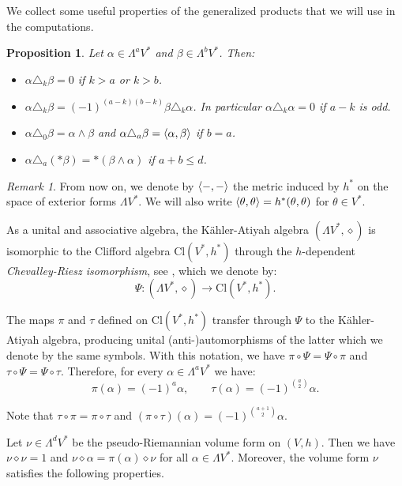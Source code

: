 \documentclass[10pt,reqno]{amsart}
\newtheorem{proposition}[theorem]{Proposition}
\theoremstyle{definition}
\theoremstyle{remark}
\newtheorem{remark}[theorem]{Remark}
\DeclarePairedDelimiter{\escal}{\langle}{\rangle}
\begin{document}
We collect some useful properties of the generalized products that we will use in the computations.

\begin{proposition}\label{prop:properties_triangles}
    Let $\alpha\in\Lambda^aV^*$ and $\beta\in\Lambda^bV^*$. Then: \begin{itemize}
        \item $\alpha\triangle_k\beta=0$ if $k>a$ or $k>b$.
        \item $\alpha\triangle_k\beta=(-1)^{(a-k)(b-k)}\beta\triangle_k\alpha$. In particular $\alpha\triangle_k\alpha=0$ if $a-k$ is odd.
        \item $\alpha\triangle_0\beta=\alpha\wedge\beta$ and $\alpha\triangle_a\beta=\escal{\alpha,\beta}$ if $b=a$.
        \item $\alpha\triangle_a(*\beta)=*(\beta\wedge\alpha)$ if $a+b\leq d$.
    \end{itemize}
\end{proposition}

\begin{remark}
    From now on, we denote by $\escal{-,-}$ the metric induced by $h^*$ on the space of exterior forms $\Lambda V^*$. We will also write $\escal{\theta,\theta}=h^*(\theta,\theta)$ for $\theta\in V^*$.
\end{remark}

As a unital and associative algebra, the Kähler-Atiyah algebra $(\Lambda V^*,\diamond)$ is isomorphic to the Clifford algebra $\mathrm{Cl}(V^*,h^*)$ through the $h$-dependent \emph{Chevalley-Riesz isomorphism}, see \cite{Cortes_Lazaroiu_Shahbazi2021,Lazaroiu_Babalic_Coman2013,Lazaroiu_Babalic_Coman2016}, which we denote by: $$\Psi\colon(\Lambda V^*,\diamond)\to\mathrm{Cl}(V^*,h^*).$$

The maps $\pi$ and $\tau$ defined on $\mathrm{Cl}(V^*,h^*)$ transfer through $\Psi$ to the Kähler-Atiyah algebra, producing unital (anti-)automorphisms of the latter which we denote by the same symbols. With this notation, we have $\pi\circ\Psi=\Psi\circ\pi$ and $\tau\circ\Psi=\Psi\circ\tau$. Therefore, for every $\alpha\in\Lambda^aV^*$ we have: $$\pi(\alpha)=(-1)^a\alpha,\qquad\tau(\alpha)=(-1)^{\binom{a}{2}}\alpha.$$

Note that $\tau\circ\pi=\pi\circ\tau$ and $(\pi\circ\tau)(\alpha)=(-1)^{\binom{a+1}{2}}\alpha$.\medskip

Let $\nu\in\Lambda^dV^*$ be the pseudo-Riemannian volume form on $(V,h)$. Then we have $\nu\diamond\nu=1$ and $\nu\diamond\alpha=\pi(\alpha)\diamond\nu$ for all $\alpha\in\Lambda V^*$. Moreover, the volume form $\nu$ satisfies the following properties.
\end{document}
